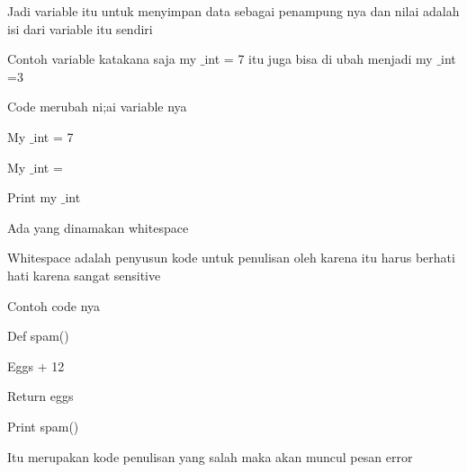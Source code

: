 {\fontsize{14pt}{14pt}\selectfont Jadi variable itu untuk menyimpan data sebagai penampung nya dan nilai adalah isi dari variable itu sendiri \\} \par
\vspace{14pt}
\noindent 
{\fontsize{14pt}{14pt}\selectfont Contoh variable katakana saja my $  \_  $int = 7 itu juga bisa di ubah menjadi my $  \_  $int =3  \\} \par
\vspace{14pt}
\noindent 
{\fontsize{14pt}{14pt}\selectfont Code merubah ni;ai variable nya  \\} \par
\noindent 
{\fontsize{14pt}{14pt}\selectfont My $  \_  $int = 7 \\} \par
\noindent 
{\fontsize{14pt}{14pt}\selectfont My $  \_  $int = \\} \par
\noindent 
{\fontsize{14pt}{14pt}\selectfont Print my $  \_  $int \\} \par
\vspace{14pt}
\noindent 
{\fontsize{14pt}{14pt}\selectfont Ada yang dinamakan whitespace  \\} \par
\vspace{14pt}
\noindent 
{\fontsize{14pt}{14pt}\selectfont Whitespace adalah penyusun kode untuk penulisan oleh karena itu harus berhati hati karena sangat sensitive \\} \par
\vspace{14pt}
\noindent 
{\fontsize{14pt}{14pt}\selectfont Contoh code nya  \\} \par
\noindent 
{\fontsize{14pt}{14pt}\selectfont Def spam() \\} \par
\noindent 
{\fontsize{14pt}{14pt}\selectfont Eggs + 12 \\} \par
\noindent 
{\fontsize{14pt}{14pt}\selectfont Return eggs \\} \par
\noindent 
{\fontsize{14pt}{14pt}\selectfont Print spam() \\} \par
\vspace{14pt}
\noindent 
{\fontsize{14pt}{14pt}\selectfont Itu merupakan kode penulisan yang salah maka akan muncul pesan error \\} \par
